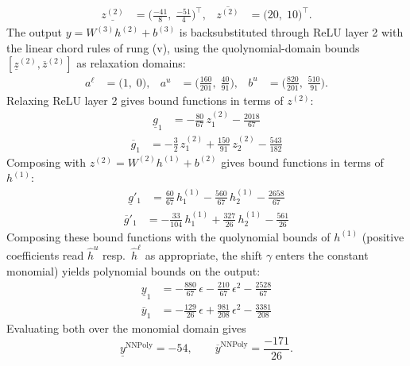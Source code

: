 \documentclass[11pt]{article}
\begin{document}
\begin{align*}
\underline{z^{(2)}} &= \bigl(\frac{-41}{8},\; \frac{-51}{4}\bigr)^{\!\top}, & \overline{z^{(2)}} &= \bigl(20,\; 10\bigr)^{\!\top}.
\end{align*}
The output $y = W^{(3)} h^{(2)} + b^{(3)}$ is backsubstituted through ReLU layer 2 with the linear chord rules of rung (v), using the quolynomial-domain bounds
$[\underline{z}^{(2)}, \overline{z}^{(2)}]$ as relaxation domains:
\begin{align*}
a^{\ell} &= \bigl(1,\; 0\bigr), & a^{u} &= \bigl(\frac{160}{201},\; \frac{40}{91}\bigr), & b^{u} &= \bigl(\frac{820}{201},\; \frac{510}{91}\bigr).
\end{align*}
Relaxing ReLU layer 2 gives bound functions in terms of $z^{(2)}$:
\begin{align*}
\underline{g}_{1} &= -\frac{80}{67}\,z^{(2)}_{1} - \frac{2018}{67}
\end{align*}
\begin{align*}
\overline{g}_{1} &= -\frac{3}{2}\,z^{(2)}_{1} + \frac{150}{91}\,z^{(2)}_{2} - \frac{543}{182}
\end{align*}
Composing with $z^{(2)} = W^{(2)} h^{(1)} + b^{(2)}$ gives bound functions in terms of $h^{(1)}$:
\begin{align*}
\underline{g}'_{1} &= \frac{60}{67}\,h^{(1)}_{1} - \frac{560}{67}\,h^{(1)}_{2} - \frac{2658}{67}
\end{align*}
\begin{align*}
\overline{g}'_{1} &= -\frac{33}{104}\,h^{(1)}_{1} + \frac{327}{26}\,h^{(1)}_{2} - \frac{561}{26}
\end{align*}
Composing these bound functions with the quolynomial bounds of $h^{(1)}$ (positive
coefficients read $\hat{h}^{u}$ resp.\ $\hat{h}^{\ell}$ as appropriate, the shift $\gamma$ enters the
constant monomial) yields polynomial bounds on the output:
\begin{align*}
\underline{y}_{1} &= -\frac{880}{67}\,\epsilon - \frac{210}{67}\,\epsilon^2 - \frac{2528}{67}
\end{align*}
\begin{align*}
\overline{y}_{1} &= -\frac{129}{26}\,\epsilon + \frac{981}{208}\,\epsilon^2 - \frac{3381}{208}
\end{align*}
Evaluating both over the monomial domain gives
\begin{equation*}
\underline{y}^{\text{NNPoly}} = -54, \qquad \overline{y}^{\text{NNPoly}} = \frac{-171}{26}.
\end{equation*}
\end{document}
